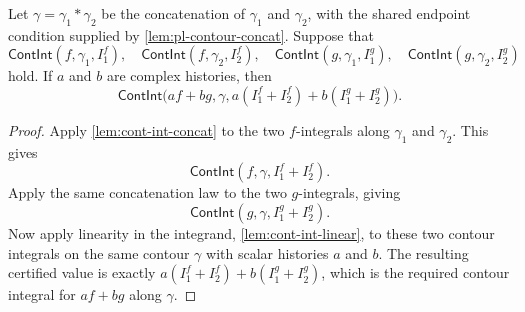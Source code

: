 \begin{lemma}
\label{lem:cont-int-affine-concat}
Let $\gamma = \gamma_1 \ast \gamma_2$ be the concatenation of $\gamma_1$ and $\gamma_2$, with the shared endpoint condition supplied by \autoref{lem:pl-contour-concat}. Suppose that
$$
\mathsf{ContInt}(f, \gamma_1, I_1^f),\quad
\mathsf{ContInt}(f, \gamma_2, I_2^f),\quad
\mathsf{ContInt}(g, \gamma_1, I_1^g),\quad
\mathsf{ContInt}(g, \gamma_2, I_2^g)
$$
hold. If $a$ and $b$ are complex histories, then
$$
\mathsf{ContInt}\bigl(a f + b g, \gamma, a(I_1^f + I_2^f) + b(I_1^g + I_2^g)\bigr).
$$
\end{lemma}
\begin{proof}
Apply \autoref{lem:cont-int-concat} to the two $f$-integrals along $\gamma_1$ and $\gamma_2$. This gives
$$
\mathsf{ContInt}(f, \gamma, I_1^f + I_2^f).
$$
Apply the same concatenation law to the two $g$-integrals, giving
$$
\mathsf{ContInt}(g, \gamma, I_1^g + I_2^g).
$$
Now apply linearity in the integrand, \autoref{lem:cont-int-linear}, to these two contour integrals on the same contour $\gamma$ with scalar histories $a$ and $b$. The resulting certified value is exactly $a(I_1^f + I_2^f) + b(I_1^g + I_2^g)$, which is the required contour integral for $a f + b g$ along $\gamma$.
\end{proof}
